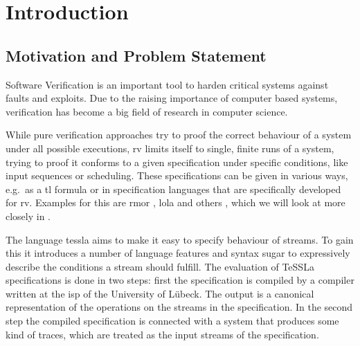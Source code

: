 %
\chapter{Introduction}
\label{sec:intro}


\section{Motivation and Problem Statement}
\label{sec:intro:motivation}

Software Verification is an important tool to harden critical systems against faults and exploits.
Due to the raising importance of computer based systems, verification has become a big field of research in computer science.

While pure verification approaches try to proof the correct behaviour of a system under all possible executions,
\gls{rv} limits itself to single, finite runs of a system, trying to proof it conforms to a given specification
under specific conditions, like input sequences or scheduling.
These specifications can be given in various ways, e.g.\ as a \gls{tl} formula or in specification languages that are specifically developed for \gls{rv}.
Examples for this are \gls{rmor} \citep{Havelund2008}, \gls{lola} \citep{DAngelo2005} and others \citep{Zheng2015, Pike2010, Mostafa2015}, which we will look at more closely in .

The language \gls{tessla} aims to make it easy to specify behaviour of streams.
To gain this it introduces a number of language features and syntax sugar to expressively describe the conditions a stream should fulfill.
The evaluation of TeSSLa specifications is done in two steps: first the specification is compiled by a compiler written at the \gls{isp} of the University of Lübeck.
The output is a canonical representation of the operations on the streams in the specification.
In the second step the compiled specification is connected with a system that produces some kind of traces, which are treated as the input streams of the specification.


